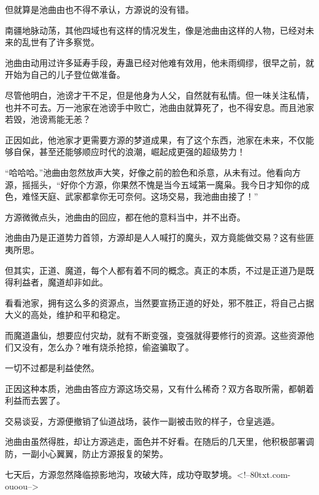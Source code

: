 \begin{this_body}
但就算是池曲由也不得不承认，方源说的没有错。

南疆地脉动荡，其他四域也有这样的情况发生，像是池曲由这样的人物，已经对未来的乱世有了许多察觉。

池曲由动用过许多延寿手段，寿蛊已经对他难有效用，他未雨绸缪，很早之前，就开始为自己的儿子登位做准备。

尽管他明白，池谤才干不足，但是他身为人父，自然就有私情。但一味关注私情，也并不可去。万一池家在池谤手中败亡，池曲由就算死了，也不得安息。而且池家若毁，池谤焉能无恙？

正因如此，他池家才更需要方源的梦道成果，有了这个东西，池家在未来，不仅能够自保，甚至还能够顺应时代的浪潮，崛起成更强的超级势力！

“哈哈哈。”池曲由忽然放声大笑，好像之前的脸色和杀意，从未有过。他看向方源，摇摇头，“好你个方源，你果然不愧是当今五域第一魔枭。我今日才知你的成色，难怪天庭、武家都拿你无可奈何。这场交易，我池曲由接了！”

方源微微点头，池曲由的回应，都在他的意料当中，并不出奇。

池曲由乃是正道势力首领，方源却是人人喊打的魔头，双方竟能做交易？这有些匪夷所思。

但其实，正道、魔道，每个人都有着不同的概念。真正的本质，不过是正道乃是既得利益者，魔道却非如此。

看看池家，拥有这么多的资源点，当然要宣扬正道的好处，邪不胜正，将自己占据大义的高处，维护和平和稳定。

而魔道蛊仙，想要应付灾劫，就有不断变强，变强就得要修行的资源。这些资源他们又没有，怎么办？唯有烧杀抢掠，偷盗骗取了。

一切不过都是利益使然。

正因这种本质，池曲由答应方源这场交易，又有什么稀奇？双方各取所需，都朝着利益而去罢了。

交易谈妥，方源便撤销了仙道战场，装作一副被击败的样子，仓皇逃遁。

池曲由虽然得胜，却让方源逃走，面色并不好看。在随后的几天里，他积极部署调防，一副小心翼翼，防止方源报复的架势。

七天后，方源忽然降临掠影地沟，攻破大阵，成功夺取梦境。<!--80txt.com-ouoou-->

\end{this_body}

